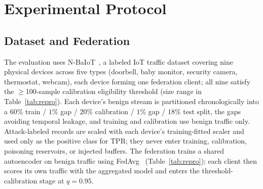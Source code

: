 \section{Experimental Protocol}
\label{sec:method}

\subsection{Dataset and Federation}

The evaluation uses N-BaIoT~\cite{meidan2018nbaiot}, a labeled IoT traffic dataset covering nine physical devices across five types (doorbell, baby monitor, security camera, thermostat, webcam), each device forming one federation client; all nine satisfy the $\ge$100-sample calibration eligibility threshold (size range in Table~\ref{tab:repro}).
Each device's benign stream is partitioned chronologically into a $60\%$ train / $1\%$ gap / $20\%$ calibration / $1\%$ gap / $18\%$ test split, the gaps avoiding temporal leakage, and training and calibration use benign traffic only.
Attack-labeled records are scaled with each device's training-fitted scaler and used only as the positive class for TPR; they never enter training, calibration, poisoning reservoirs, or injected buffers.
The federation trains a shared autoencoder on benign traffic using FedAvg~\cite{mcmahan2017fedavg,kairouz2021advances} (Table~\ref{tab:repro}); each client then scores its own traffic with the aggregated model and enters the threshold-calibration stage at $q{=}0.95$.

